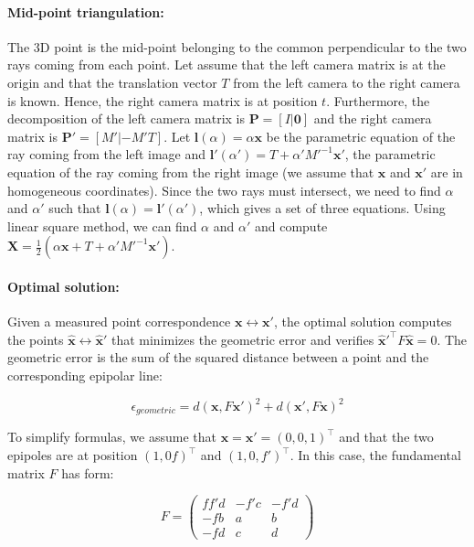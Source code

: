 \documentclass[12pt]{article}
\begin{document}
\paragraph{Mid-point triangulation:} 

The 3D point is the mid-point belonging to the common perpendicular to the two rays coming from each point. Let assume that the left camera matrix is at the origin and that the translation vector $T$ from the left camera to the right camera is known. Hence, the right camera matrix is at position $t$. Furthermore, the decomposition of the left camera matrix is $\mathbf{P} = [I|\mathbf{0}]$ and the right camera matrix is $\mathbf{P}' = [M' | -M'T]$. Let $\mathbf{l}(\alpha) = \alpha\mathbf{x}$ be the parametric equation of the ray coming from the left image and $\mathbf{l}'(\alpha') = T + \alpha' M'^{-1}\mathbf{x}'$, the parametric equation of the ray coming from the right image (we assume that $\mathbf{x}$ and $\mathbf{x}'$ are in homogeneous coordinates). Since the two rays must intersect, we need to find $\alpha$ and $\alpha'$ such that $\mathbf{l}(\alpha) = \mathbf{l}'(\alpha')$, which gives a set of three equations. Using linear square method, we can find $\alpha$ and $\alpha'$ and compute $\mathbf{X} = \frac{1}{2} (\alpha \mathbf{x} + T + \alpha' M'^{-1} \mathbf{x}')$.

\paragraph{Optimal solution:}

Given a measured point correspondence $\mathbf{x} \leftrightarrow \mathbf{x}'$, the optimal solution computes the points $\hat{\mathbf{x}} \leftrightarrow \hat{\mathbf{x}}'$ that minimizes the geometric error and verifies $\hat{\mathbf{x}}'^{\top}F\hat{\mathbf{x}} = 0$. The geometric error is the sum of the squared distance between a point and the corresponding epipolar line:

\[
 \epsilon_{geometric} = d(\mathbf{x}, F\mathbf{x}')^2 + d(\mathbf{x}', F\mathbf{x})^2
\]

To simplify formulas, we assume that $\mathbf{x} = \mathbf{x}' = (0, 0, 1)^\top$ and that the two epipoles are at position $(1, 0 f)^\top$ and $(1, 0, f')^\top$. In this case, the fundamental matrix $F$ has form:

\[
F =
\left (
\begin{matrix}
	ff'd & -f'c & -f'd \\
	-fb & a & b \\
	-fd & c & d
\end{matrix}
\right )
\]
\end{document}
